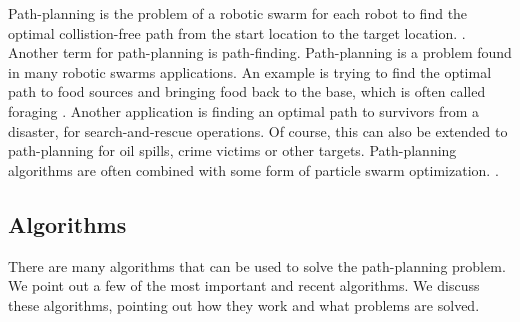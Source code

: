 
Path-planning is the problem of a robotic swarm for each robot to find the optimal collistion-free path from the start location to the target location. \cite{qin2004path}.
Another term for path-planning is path-finding. 
Path-planning is a problem found in many robotic swarms applications.
An example is trying to find the optimal path to food sources and bringing food back to the base, which is often called foraging \cite{hoff2010two}.
Another application is finding an optimal path to survivors from a disaster, for search-and-rescue operations.
Of course, this can also be extended to path-planning for oil spills, crime victims or other targets.\cite{pugh2007inspiring} 
Path-planning algorithms are often combined with some form of particle swarm optimization. \cite{poli2007particle}. \\

\subsection{Algorithms}

There are many algorithms that can be used to solve the path-planning problem. 
We point out a few of the most important and recent algorithms. \cite{hoff2010two} \cite{bhattacharjee2011multi} \cite{jung2010multi} \cite{kala2012multi}
We discuss these algorithms, pointing out how they work and what problems are solved. \\

